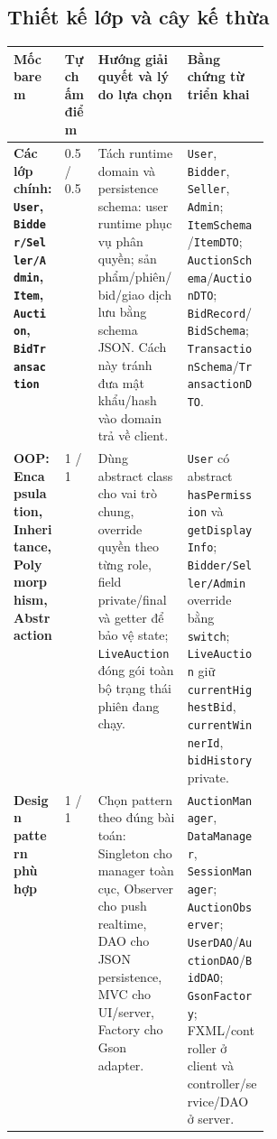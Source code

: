 \documentclass[10pt,a4paper]{article}
\begin{document}
\subsection*{Thiết kế lớp và cây kế thừa}
{\scriptsize
\setlength{\tabcolsep}{3pt}
\noindent
\begin{tabularx}{\linewidth}{>{\raggedright\arraybackslash\bfseries}p{0.20\linewidth} p{0.13\linewidth} Y Y}
\toprule
Mốc barem & Tự chấm điểm & Hướng giải quyết và lý do lựa chọn & Bằng chứng từ triển khai \\
\midrule
Các lớp chính: \texttt{User}, \texttt{Bidder/Seller/Admin}, \texttt{Item}, \texttt{Auction}, \texttt{BidTransaction} & 0.5 / 0.5 & Tách runtime domain và persistence schema: user runtime phục vụ phân quyền; sản phẩm/phiên/bid/giao dịch lưu bằng schema JSON. Cách này tránh đưa mật khẩu/hash vào domain trả về client. & \texttt{User}, \texttt{Bidder}, \texttt{Seller}, \texttt{Admin}; \texttt{ItemSchema}/\texttt{ItemDTO}; \texttt{AuctionSchema}/\texttt{AuctionDTO}; \texttt{BidRecord}/\texttt{BidSchema}; \texttt{TransactionSchema}/\texttt{TransactionDTO}. \\
\addlinespace
OOP: Encapsulation, Inheritance, Polymorphism, Abstraction & 1 / 1 & Dùng abstract class cho vai trò chung, override quyền theo từng role, field private/final và getter để bảo vệ state; \texttt{LiveAuction} đóng gói toàn bộ trạng thái phiên đang chạy. & \texttt{User} có abstract \texttt{hasPermission} và \texttt{getDisplayInfo}; \texttt{Bidder/Seller/Admin} override bằng \texttt{switch}; \texttt{LiveAuction} giữ \texttt{currentHighestBid}, \texttt{currentWinnerId}, \texttt{bidHistory} private. \\
\addlinespace
Design pattern phù hợp & 1 / 1 & Chọn pattern theo đúng bài toán: Singleton cho manager toàn cục, Observer cho push realtime, DAO cho JSON persistence, MVC cho UI/server, Factory cho Gson adapter. & \texttt{AuctionManager}, \texttt{DataManager}, \texttt{SessionManager}; \texttt{AuctionObserver}; \texttt{UserDAO}/\texttt{AuctionDAO}/\texttt{BidDAO}; \texttt{GsonFactory}; FXML/controller ở client và controller/service/DAO ở server. \\
\bottomrule
\end{tabularx}\par}
\end{document}
